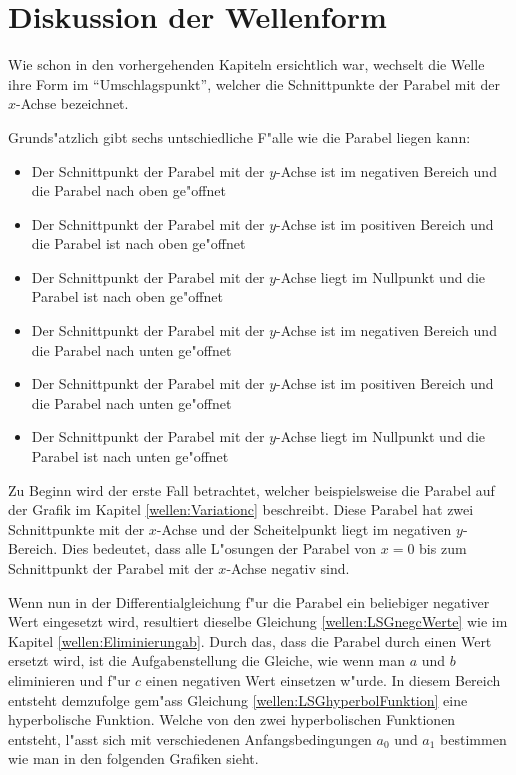 \section{Diskussion der Wellenform}
\label{wellen:DiskussionWellenform}

Wie schon in den vorhergehenden Kapiteln ersichtlich war, wechselt die Welle 
ihre Form im ``Umschlagspunkt'', welcher die Schnittpunkte der Parabel mit der 
$x$-Achse bezeichnet.


Grunds"atzlich gibt sechs untschiedliche F"alle wie die Parabel liegen kann:
\begin{itemize}
	\item Der Schnittpunkt der Parabel mit der $y$-Achse ist im negativen 
	Bereich und die Parabel nach oben ge"offnet
	\item Der Schnittpunkt der Parabel mit der $y$-Achse ist im positiven 
	Bereich und die Parabel ist nach oben ge"offnet
	\item Der Schnittpunkt der Parabel mit der $y$-Achse liegt im Nullpunkt und 
	die Parabel ist nach oben ge"offnet
	\item Der Schnittpunkt der Parabel mit der $y$-Achse ist im negativen 
	Bereich und die Parabel nach unten ge"offnet
	\item Der Schnittpunkt der Parabel mit der $y$-Achse ist im positiven 
	Bereich und die Parabel nach unten ge"offnet
	\item Der Schnittpunkt der Parabel mit der $y$-Achse liegt im Nullpunkt und 
	die Parabel ist nach unten ge"offnet
\end{itemize}

Zu Beginn wird der erste Fall betrachtet, welcher beispielsweise die Parabel 
auf der Grafik im Kapitel \ref{wellen:Variationc} beschreibt. Diese Parabel hat 
zwei Schnittpunkte mit der $x$-Achse und der Scheitelpunkt liegt im negativen 
$y$-Bereich. Dies bedeutet, dass alle L"osungen der Parabel von $x=0$ bis zum 
Schnittpunkt der Parabel mit der $x$-Achse negativ sind. 

Wenn nun in der Differentialgleichung f"ur die Parabel ein beliebiger negativer 
Wert eingesetzt wird, resultiert dieselbe Gleichung \ref{wellen:LSGnegcWerte} 
wie im Kapitel \ref{wellen:Eliminierungab}. Durch das, dass die Parabel durch 
einen Wert ersetzt wird, ist die Aufgabenstellung die Gleiche, wie wenn man $a$ 
und $b$ eliminieren und f"ur $c$ einen negativen Wert einsetzen w"urde. In 
diesem Bereich entsteht demzufolge gem"ass Gleichung 
\ref{wellen:LSGhyperbolFunktion} eine hyperbolische Funktion. Welche von den 
zwei hyperbolischen Funktionen entsteht, l"asst sich mit verschiedenen 
Anfangsbedingungen $a_0$ und $a_1$ bestimmen wie man in den folgenden Grafiken 
sieht.

